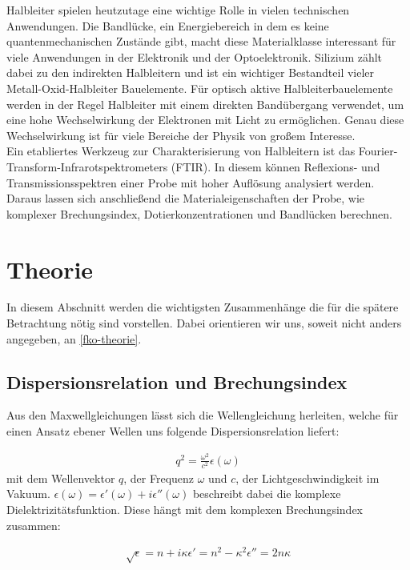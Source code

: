 \documentclass[paper=a4,fontsize=10pt,DIV=18,twocolumn,parskip=half]{scrartcl}
\numberwithin{equation}{section}    %
\begin{document}
Halbleiter spielen heutzutage eine wichtige Rolle in vielen technischen 
Anwendungen. Die Bandlücke, ein Energiebereich in dem es keine 
quantenmechanischen Zustände gibt, macht diese Materialklasse interessant für 
viele Anwendungen in der Elektronik und der Optoelektronik. Silizium zählt dabei 
zu den indirekten Halbleitern und ist ein wichtiger Bestandteil vieler 
Metall-Oxid-Halbleiter Bauelemente. Für optisch aktive Halbleiterbauelemente 
werden in der Regel Halbleiter mit einem direkten Bandübergang verwendet, um 
eine hohe Wechselwirkung der Elektronen mit Licht zu ermöglichen. Genau diese 
Wechselwirkung ist für viele Bereiche der Physik von großem Interesse. \\
Ein etabliertes Werkzeug zur Charakterisierung von Halbleitern ist das 
Fourier-Transform-Infrarotspektrometers (FTIR). In diesem können Reflexions- und 
Transmissionsspektren einer Probe mit hoher Auflösung analysiert werden. Daraus 
lassen sich anschließend die Materialeigenschaften der Probe, wie komplexer 
Brechungsindex, Dotierkonzentrationen und Bandlücken berechnen. 


\section{Theorie}
In diesem Abschnitt werden die wichtigsten Zusammenhänge die für die spätere 
Betrachtung nötig sind vorstellen. Dabei orientieren wir uns, soweit nicht 
anders angegeben, an \cref{fko-theorie}.

\subsection{Dispersionsrelation und Brechungsindex}

Aus den Maxwellgleichungen lässt sich die Wellengleichung herleiten, welche für 
einen Ansatz ebener Wellen uns folgende Dispersionsrelation liefert:

\begin{align}
    q^2 = \frac{\omega^2}{c^2}\epsilon(\omega)
\end{align}
mit dem Wellenvektor $q$, der Frequenz $\omega$ und $c$, der 
Lichtgeschwindigkeit im Vakuum.
$\epsilon(\omega)=\epsilon'(\omega)+i\epsilon''(\omega)$ beschreibt dabei die 
komplexe Dielektrizitätsfunktion. 
Diese hängt mit dem komplexen Brechungsindex zusammen:

\begin{align}
    \sqrt{\epsilon}=n+i\kappa
    \epsilon'=n^2-\kappa^2
    \epsilon''=2n\kappa
\end{align}
\end{document}

